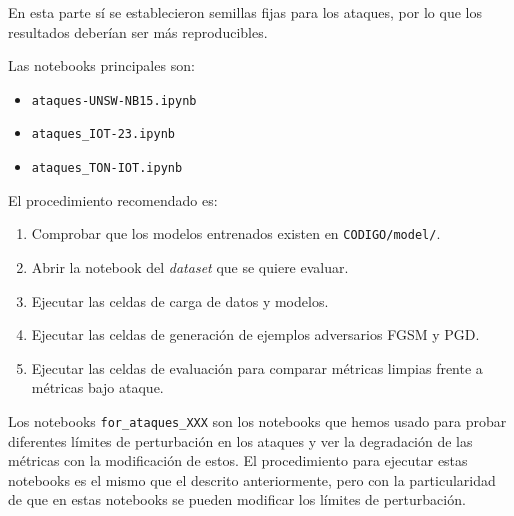 En esta parte sí se establecieron semillas fijas para los ataques, por lo que los resultados deberían ser más reproducibles.

Las notebooks principales son:

\begin{itemize}
    \item \texttt{ataques-UNSW-NB15.ipynb}
    \item \texttt{ataques\_IOT-23.ipynb}
    \item \texttt{ataques\_TON-IOT.ipynb}
\end{itemize}

El procedimiento recomendado es:

\begin{enumerate}
    \item Comprobar que los modelos entrenados existen en \texttt{CODIGO/model/}.
    \item Abrir la notebook del \textit{dataset} que se quiere evaluar.
    \item Ejecutar las celdas de carga de datos y modelos.
    \item Ejecutar las celdas de generación de ejemplos adversarios FGSM y PGD.
    \item Ejecutar las celdas de evaluación para comparar métricas limpias frente a métricas bajo ataque.
\end{enumerate}

Los notebooks \texttt{for\_ataques\_XXX} son los notebooks que hemos usado para probar diferentes límites de perturbación en los ataques y ver la degradación de las métricas con la modificación de estos. El procedimiento para ejecutar estas notebooks es el mismo que el descrito anteriormente, pero con la particularidad de que en estas notebooks se pueden modificar los límites de perturbación.
